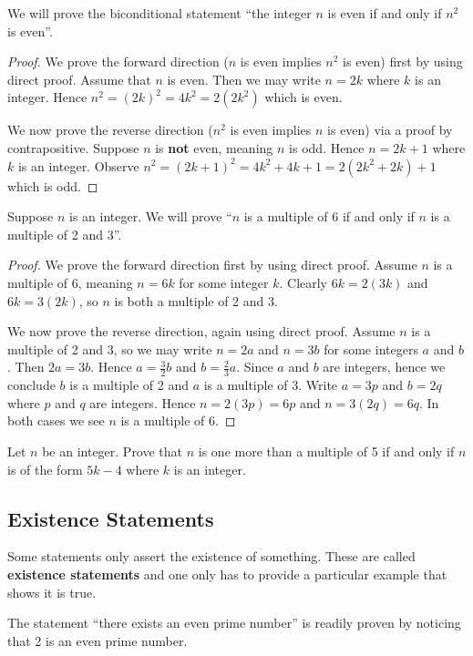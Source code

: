 \begin{example}
    We will prove the biconditional statement ``the integer $n$ is even if and only if $n^2$ is even''.
    \begin{proof}
        We prove the forward direction ($n$ is even implies $n^2$ is even) first by using direct proof. Assume that $n$ is even. Then we may write $n = 2k$ where $k$ is an integer. Hence $n^2 = (2k)^2 = 4k^2 = 2(2k^2)$ which is even.

        We now prove the reverse direction ($n^2$ is even implies $n$ is even) via a proof by contrapositive. Suppose $n$ is \textbf{not} even, meaning $n$ is odd. Hence $n = 2k + 1$ where $k$ is an integer. Observe $n^2 = (2k+1)^2 = 4k^2 + 4k + 1 = 2(2k^2 + 2k) + 1$ which is odd.
    \end{proof}
\end{example}

\begin{example}
    Suppose $n$ is an integer. We will prove ``$n$ is a multiple of 6 if and only if $n$ is a multiple of 2 and 3''.
    \begin{proof}
        We prove the forward direction first by using direct proof. Assume $n$ is a multiple of 6, meaning $n = 6k$ for some integer $k$. Clearly $6k = 2(3k)$ and $6k = 3(2k)$, so $n$ is both a multiple of 2 and 3.

        We now prove the reverse direction, again using direct proof. Assume $n$ is a multiple of 2 and 3, so we may write $n = 2a$ and $n = 3b$ for some integers $a$ and $b$. Then $2a = 3b$. Hence $a = \frac 32 b$ and $b = \frac 23 a$. Since $a$ and $b$ are integers, hence we conclude $b$ is a multiple of 2 and $a$ is a multiple of 3. Write $a = 3p$ and $b = 2q$ where $p$ and $q$ are integers. Hence $n = 2(3p) = 6p$ and $n = 3(2q) = 6q$. In both cases we see $n$ is a multiple of 6.
    \end{proof}
\end{example}

\begin{exercise}
    Let $n$ be an integer. Prove that $n$ is one more than a multiple of 5 if and only if $n$ is of the form $5k - 4$ where $k$ is an integer.
\end{exercise}

\subsection{Existence Statements}
Some statements only assert the existence of something. These are called \textbf{existence statements} and one only has to provide a particular example that shows it is true.
\begin{example}
    The statement ``there exists an even prime number'' is readily proven by noticing that 2 is an even prime number.
\end{example}

